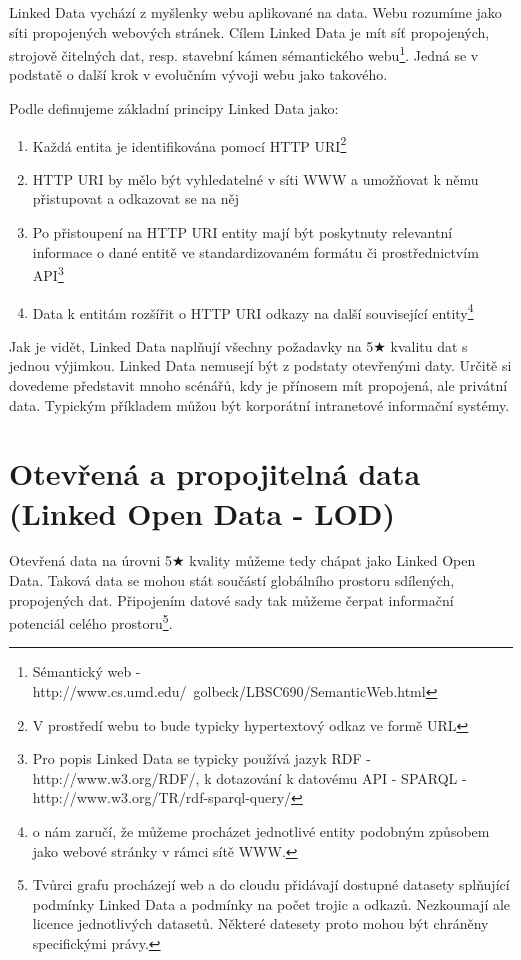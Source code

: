 Linked Data vychází z myšlenky webu aplikované na data. Webu rozumíme jako síti propojených webových stránek. Cílem Linked Data je mít síť propojených, strojově čitelných dat, resp. stavební kámen sémantického webu\footnote{Sémantický web - http://www.cs.umd.edu/~golbeck/LBSC690/SemanticWeb.html}. Jedná se v podstatě o další krok v evolučním vývoji webu jako takového.

Podle \cite{linkedData} definujeme základní principy Linked Data jako:

\begin{enumerate}
\item Každá entita je identifikována pomocí HTTP URI\footnote{V prostředí webu to bude typicky hypertextový odkaz ve formě URL}    
\item HTTP URI by mělo být vyhledatelné v síti WWW a umožňovat k němu přistupovat a odkazovat se na něj
\item Po přistoupení na HTTP URI entity mají být poskytnuty relevantní informace o dané entitě ve standardizovaném formátu či prostřednictvím API\footnote{Pro popis Linked Data se typicky používá jazyk RDF - http://www.w3.org/RDF/, k dotazování k datovému API - SPARQL - http://www.w3.org/TR/rdf-sparql-query/}
\item Data k entitám rozšířit o HTTP URI odkazy na další související entity\footnote{o nám zaručí, že můžeme procházet jednotlivé entity podobným způsobem jako webové stránky v rámci sítě WWW.}
\end{enumerate}

Jak je vidět, Linked Data naplňují všechny požadavky na 5$\bigstar$ kvalitu dat s jednou výjimkou. Linked Data nemusejí být z podstaty otevřenými daty. Určitě si dovedeme představit mnoho scénářů, kdy je přínosem mít propojená, ale privátní data. Typickým příkladem můžou být korporátní intranetové informační systémy.

\section{Otevřená a propojitelná data (Linked Open Data - LOD)}

Otevřená data na úrovni 5$\bigstar$ kvality můžeme tedy chápat jako Linked Open Data. Taková data se mohou stát součástí globálního prostoru sdílených, propojených dat. Připojením datové sady tak můžeme čerpat informační potenciál celého prostoru\footnote{Tvůrci grafu procházejí web a do cloudu přidávají dostupné datasety splňující podmínky Linked Data a podmínky na počet trojic a odkazů. Nezkoumají ale licence jednotlivých datasetů. Některé datesety proto mohou být chráněny specifickými právy.}.

